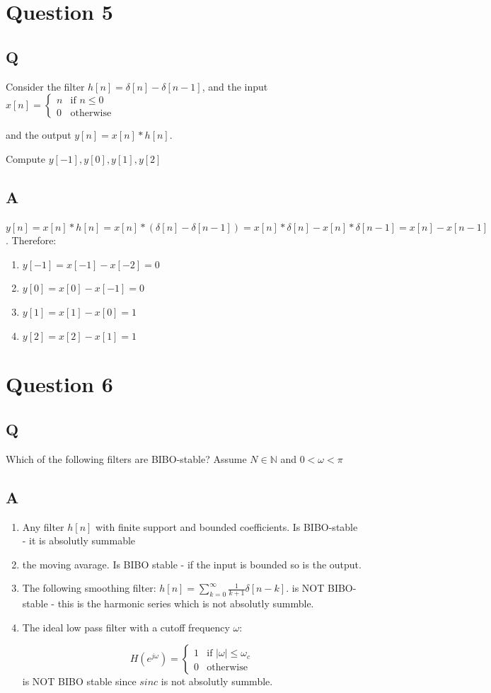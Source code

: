 \documentclass[a4paper]{article}
\begin{document}
\section{Question 5}
\subsection{Q}


Consider the filter $h[n]=\delta[n]-\delta[n-1]$, and the input $x[n] = \begin{cases} n &\mbox{if } n \leq 0  \\
0 & \mbox{otherwise } \end{cases}$ 

and the output $y[n]=x[n]\ast h[n]$.

Compute $y[-1],y[0],y[1],y[2]$

\subsection{A}
$y[n]=x[n]\ast h[n] = x[n]\ast (\delta[n]-\delta[n-1]) = x[n]\ast \delta[n] - x[n]\ast \delta[n-1] = x[n] - x[n-1] $. Therefore:
\begin{enumerate}
\item $y[-1] = x[-1] - x[-2] = 0$
\item $y[0] = x[0] - x[-1] = 0$
\item $y[1] = x[1] - x[0] = 1$
\item $y[2] = x[2] - x[1] = 1$
\end{enumerate}

\section{Question 6}
\subsection{Q}
Which of the following filters are BIBO-stable?
Assume $N \in \mathbb{N}$ and $0 < \omega < \pi$
 
\subsection{A}
\begin{enumerate}
\item Any filter $h[n]$ with finite support and bounded coefficients.
Is BIBO-stable - it is absolutly summable
\item the moving avarage. Is BIBO stable - if the input is bounded so is the output.
\item The following smoothing filter: $h[n]=\sum_{k=0}^\infty \frac{1}{k+1}\delta[n-k]$.
is NOT BIBO-stable - this is the harmonic series which is not absolutly summble.
\item The ideal low pass filter with a cutoff frequency $\omega$:

$$
H(e^{j\omega}) = \begin{cases} 1 &\mbox{if } |\omega| \leq \omega_c  \\
0 & \mbox{otherwise } \end{cases} 
$$
is NOT BIBO stable since $sinc$ is not absolutly summble.
\end{enumerate} 
\end{document}
